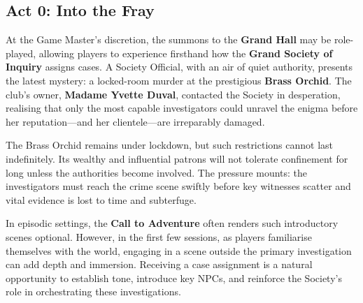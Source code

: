 \subsection{Act 0: Into the Fray}

At the Game Master's discretion, the summons to the \textbf{Grand Hall} may be role-played, allowing players to experience firsthand how the \textbf{Grand Society of Inquiry} assigns cases. A Society Official, with an air of quiet authority, presents the latest mystery: a locked-room murder at the prestigious \textbf{Brass Orchid}. The club’s owner, \textbf{Madame Yvette Duval}, contacted the Society in desperation, realising that only the most capable investigators could unravel the enigma before her reputation—and her clientele—are irreparably damaged.

The Brass Orchid remains under lockdown, but such restrictions cannot last indefinitely. Its wealthy and influential patrons will not tolerate confinement for long unless the authorities become involved. The pressure mounts: the investigators must reach the crime scene swiftly before key witnesses scatter and vital evidence is lost to time and subterfuge.

\begin{WyrdGmTips}
	In episodic settings, the \textbf{Call to Adventure} often renders such introductory scenes optional. However, in the first few sessions, as players familiarise themselves with the world, engaging in a scene outside the primary investigation can add depth and immersion. Receiving a case assignment is a natural opportunity to establish tone, introduce key NPCs, and reinforce the Society’s role in orchestrating these investigations.
\end{WyrdGmTips}
